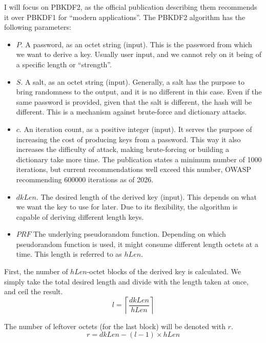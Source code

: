 I will focus on PBKDF2, as the official publication describing them recommends it over PBKDF1 for ``modern applications''.
The PBKDF2 algorithm has the following parameters:
\begin{itemize}
    \item $P$.
        A password, as an octet string (input).
        This is the password from which we want to derive a key.
        Usually user input, and we cannot rely on it being of a specific length or ``strength''.
    \item $S$.
        A salt, as an octet string (input).
        Generally, a salt has the purpose to bring randomness to the output, and it is no different in this case.
        Even if the same password is provided, given that the salt is different, the hash will be different.
        This is a mechanism against brute-force and dictionary attacks.
    \item $c$.
        An iteration count, as a positive integer (input).
        It serves the purpose of increasing the cost of producing keys from a password.
        This way it also increases the difficulty of attack, making brute-forcing or building a dictionary take more time.
        The publication states a minimum number of 1000 iterations, but current recommendations well exceed this number, OWASP recommending 600000 iterations as of 2026\cite{pbkdf2-600000-iterations}.
    \item $dkLen$.
        The desired length of the derived key (input).
        This depends on what we want the key to use for later.
        Due to its flexibility, the algorithm is capable of deriving different length keys.
    \item $PRF$
        The underlying pseudorandom function.
        Depending on which pseudorandom function is used, it might consume different length octets at a time.
        This length is referred to as $hLen$.
\end{itemize}

First, the number of $hLen$-octet blocks of the derived key is calculated.
We simply take the total desired length and divide with the length taken at once, and ceil the result.
\begin{equation}
l = \left\lceil \frac{dkLen}{hLen} \right\rceil
\end{equation}

The number of leftover octets (for the last block) will be denoted with $r$.
\begin{equation}
r = dkLen - (l - 1) \times hLen
\end{equation}

